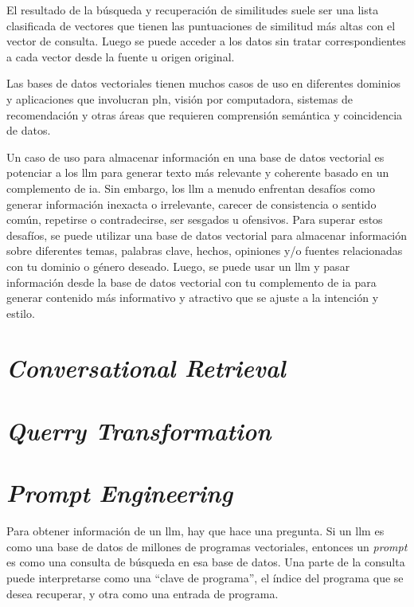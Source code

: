 
El resultado de la búsqueda y recuperación de similitudes suele ser una lista clasificada de vectores que tienen las puntuaciones de similitud más altas con el vector de consulta. Luego se puede acceder a los datos sin tratar correspondientes a cada vector desde la fuente u origen original.

Las bases de datos vectoriales tienen muchos casos de uso en diferentes dominios y aplicaciones que involucran \acrlong{pln}, visión por computadora, sistemas de recomendación y otras áreas que requieren comprensión semántica y coincidencia de datos.

Un caso de uso para almacenar información en una base de datos vectorial es potenciar a los \acrlong{llm} para generar texto más relevante y coherente basado en un complemento de \acrlong{ia}. Sin embargo, los \acrshort{llm} a menudo enfrentan desafíos como generar información inexacta o irrelevante, carecer de consistencia o sentido común, repetirse o contradecirse, ser sesgados u ofensivos. Para superar estos desafíos, se puede utilizar una base de datos vectorial para almacenar información sobre diferentes temas, palabras clave, hechos, opiniones y/o fuentes relacionadas con tu dominio o género deseado. Luego, se puede usar un \acrlong{llm} y pasar información desde la base de datos vectorial con tu complemento de \acrlong{ia} para generar contenido más informativo y atractivo que se ajuste a la intención y estilo.

\section{\textit{Conversational Retrieval}}

\section{\textit{Querry Transformation}}

\section{\textit{Prompt Engineering}}

Para obtener información de un \acrshort{llm}, hay que hace una pregunta. Si un \acrshort{llm} es como una base de datos de millones de programas vectoriales, entonces un \textit{prompt} es como una consulta de búsqueda en esa base de datos. Una parte de la consulta puede interpretarse como una ``clave de programa'', el índice del programa que se desea recuperar, y otra como una entrada de programa.


